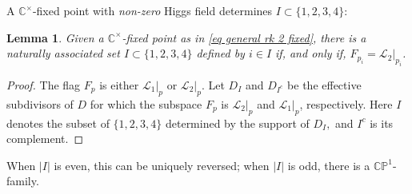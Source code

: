 \documentclass[12pt,letterpaper,reqno]{amsart}
\newtheorem{lem}[thm]{Lemma}
\theoremstyle{remark}
\theoremstyle{definition}
\numberwithin{thm}{section}
\numberwithin{equation}{section}
\numberwithin{figure}{section}
\newcommand{\cL}{\ensuremath{\mathcal L}}
\newcommand{\C}{\ensuremath{\mathbb C}}
\begin{document}
A $\C^\times$-fixed point with \emph{non-zero} Higgs field determines $I\subset \{1, 2, 3, 4\}$:
\begin{lem}\label{lem:fixedtoI}
Given a $\C^\times$-fixed point as in \eqref{eq general rk 2 fixed}, there is a naturally associated set $I \subset \{1, 2, 3,4 \}$ defined by $i \in I$ if, and only if, $F_{p_i} = \mathcal{L}_2|_{p_i}$.
\end{lem}
\begin{proof}
The flag $F_p$ is either $\cL_1|_p$ or $\cL_2|_p$. Let $D_I$ and $D_{I^c}$ be the effective subdivisors of $D$ for which the subspace $F_p$ is $\cL_2|_p$ and $\cL_1|_p$, respectively. 
Here $I$ denotes the subset of $\{1,2,3,4\}$ determined by the support of $D_I,$ and $I^c$ is its complement.   
\end{proof}

 When $|I|$ is even, this can be uniquely reversed; when $|I|$ is odd, there is a $\mathbb{CP}^1$-family. 
\end{document}
